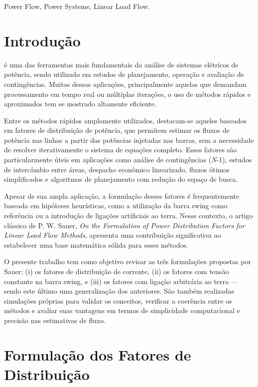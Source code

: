 \documentclass[journal]{IEEEtran}
\begin{document}
\begin{IEEEkeywords}
Power Flow, Power Systems, Linear Load Flow. %
\end{IEEEkeywords}

\section{Introdução}
 é uma das ferramentas mais fundamentais da análise de sistemas elétricos de potência, sendo utilizado em estudos de planejamento, operação e avaliação de contingências. Muitas dessas aplicações, principalmente aquelas que demandam processamento em tempo real ou múltiplas iterações, o uso de métodos rápidos e aproximados tem se mostrado altamente eficiente.

Entre os métodos rápidos amplamente utilizados, destacam-se aqueles baseados em fatores de distribuição de potência, que permitem estimar os fluxos de potência nas linhas a partir das potências injetadas nas barras, sem a necessidade de resolver iterativamente o sistema de equações completo. Esses fatores são particularmente úteis em aplicações como análise de contingências (\textit{N}-1), estudos de intercâmbio entre áreas, despacho econômico linearizado, fluxos ótimos simplificados e algoritmos de planejamento com redução do espaço de busca.

Apesar de sua ampla aplicação, a formulação desses fatores é frequentemente baseada em hipóteses heurísticas, como a utilização da barra swing como referência ou a introdução de ligações artificiais ao terra. Nesse contexto, o artigo clássico de P. W. Sauer, \textit{On the Formulation of Power Distribution Factors for Linear Load Flow Methods}, apresenta uma contribuição significativa ao estabelecer uma base matemática sólida para esses métodos.

O presente trabalho tem como objetivo revisar as três formulações propostas por Sauer: (i) os fatores de distribuição de corrente, (ii) os fatores com tensão constante na barra swing, e (iii) os fatores com ligação arbitrária ao terra — sendo este último uma generalização dos anteriores. São também realizadas simulações próprias para validar os conceitos, verificar a coerência entre os métodos e avaliar suas vantagens em termos de simplicidade computacional e precisão nas estimativas de fluxo.

\section{Formulação dos Fatores de Distribuição}
\end{document}
